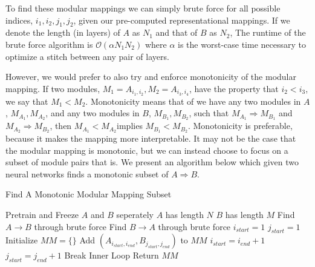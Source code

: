 \documentclass{article} %
\begin{document}
To find these modular mappings we can simply brute force for all possible indices, \(i_1, i_2, j_1, j_2\),
given our pre-computed representational mappings. If we denote the length (in layers) of \(A\) as \(N_1\) and
that of \(B\) as \(N_2\), The runtime of the brute force algorithm is \(\mathcal{O}(\alpha N_1 N_2)\) where \(\alpha\) is
the worst-case time necessary to optimize a stitch between any pair of layers.

However, we would prefer to also try and enforce monotonicity of the modular mapping. If two modules, \(M_1 = A_{i_1, i_2}, M_2 = A_{i_3, i_4}\),
have the property that \(i_2 < i_3\), we say that \(M_1 < M_2\). Monotonicity means that of we have any two modules in \(A\),
\(M_{A_1}, M_{A_2}\), and any two modules in \(B\), \(M_{B_1}, M_{B_2}\), such that \(M_{A_1} \Rightarrow M_{B_1}\)
and \(M_{A_2} \Rightarrow M_{B_2}\), then \(M_{A_1} < M_{A_2}\)implies \(M_{B_1} < M_{B_2}\). Monotonicity is preferable, because
it makes the mapping more interpretable. It may not be the case that the modular mapping is monotonic, but we can instead choose to
focus on a subset of module pairs that is. We present an algorithm below which given two neural networks finds a monotonic subset of
\(A \Rightarrow B\).

\begin{center}
\begin{algorithm}
\caption{Find A Monotonic Modular Mapping Subset}
\begin{algorithmic}[h]
      \State Pretrain and Freeze \(A\) and \(B\) seperately
      \State \(A\) has length \(N\)
      \State \(B\) has length \(M\)
      \State Find \(A\rightarrow B\) through brute force
      \State Find \(B\rightarrow A\) through brute force
      \State \(i_{start} = 1\)
      \State \(j_{start} = 1\)
      \State Initialize \(MM = \{\}\)
               \State Add \((A_{i_{start}, i_{end}}, B_{j_{start}, j_{end}})\) to \(MM\)
               \State \(i_{start} = i_{end} + 1\)
               \State \(j_{start} = j_{end} + 1\)
               \State Break Inner Loop
            \EndIf
         \EndFor
      \EndFor
      \State Return \(MM\)
\EndProcedure
\end{algorithmic}
\end{algorithm}
\end{center}
\end{document}
